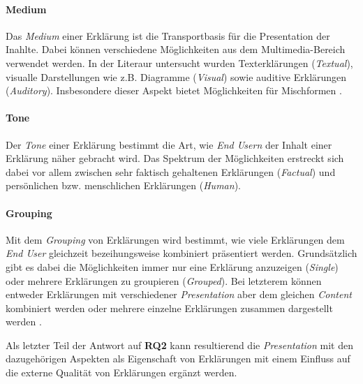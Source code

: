 \paragraph{Medium} Das \textit{Medium} einer Erklärung ist die Transportbasis für die Presentation der Inahlte. Dabei können verschiedene Möglichkeiten aus dem Multimedia-Bereich verwendet werden. In der Literaur untersucht wurden Texterklärungen (\textit{Textual}), visualle Darstellungen wie z.B. Diagramme (\textit{Visual}) sowie auditive Erklärungen (\textit{Auditory}). Insbesondere dieser Aspekt bietet Möglichkeiten für Mischformen \cite{kouki_user_2017}.

\paragraph{Tone} Der \textit{Tone} einer Erklärung bestimmt die Art, wie \textit{End Usern} der Inhalt einer Erklärung näher gebracht wird. Das Spektrum der Möglichkeiten erstreckt sich dabei vor allem zwischen sehr faktisch gehaltenen Erklärungen (\textit{Factual}) und persönlichen bzw. menschlichen Erklärungen (\textit{Human}).

\paragraph{Grouping} Mit dem \textit{Grouping} von Erklärungen wird bestimmt, wie viele Erklärungen dem \textit{End User} gleichzeit bezeihungsweise kombiniert präsentiert werden. Grundsätzlich gibt es dabei die Möglichkeiten immer nur eine Erklärung anzuzeigen (\textit{Single}) oder mehrere Erklärungen zu groupieren (\textit{Grouped}). Bei letzterem können entweder Erklärungen mit verschiedener \textit{Presentation} aber dem gleichen \textit{Content} kombiniert werden \cite{kouki_user_2017} oder mehrere einzelne Erklärungen zusammen dargestellt werden \cite{balog_measuring_2020}.

\bigskip

Als letzter Teil der Antwort auf \textbf{RQ2} kann resultierend die \textit{Presentation} mit den dazugehörigen Aspekten als Eigenschaft von Erklärungen mit einem Einfluss auf die externe Qualität von Erklärungen ergänzt werden.

\smallskip

\noindent{}

